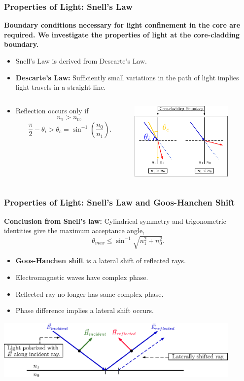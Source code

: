 \documentclass{beamer}
\begin{document}
\begin{frame}
\frametitle{\textbf{Properties of Light:} Snell's Law}
\textbf{Boundary conditions necessary for light confinement in the core are required. We investigate the properties of light at the core-cladding boundary.}
\begin{itemize}
\item Snell's Law is derived from Descarte's Law.
\item \textbf{Descarte's Law:} Sufficiently small variations in the path of light implies light travels in a straight line.
\end{itemize}
\begin{minipage}[1.0\textheight]{\textwidth}
\begin{columns}[T]
\begin{column}{0.45\textwidth}
\vspace{5mm}\begin{itemize}
\item Reflection occurs only if $$n_1>n_0,$$ $$\frac{\pi}{2}-\theta_i>\theta_c=\sin^{-1}{\left(\frac{n_0}{n_1}\right)}.$$
\end{itemize}
\end{column}
\begin{column}{0.5\textwidth}
\includegraphics[width=5cm]{snellsLaw.eps}
\end{column}
\end{columns}
\end{minipage}
\end{frame}

\begin{frame}
\frametitle{\textbf{Properties of Light:} Snell's Law and Goos-Hanchen Shift}
\textbf{Conclusion from Snell's law: }Cylindrical symmetry and trigonometric identities give the maximum acceptance angle,
$$\theta_{max}\leq \sin^{-1}{\sqrt{n_1^2+n_0^2}}.$$
\begin{itemize}
\item \textbf{Goos-Hanchen shift} is a lateral shift of reflected rays.
\item Electromagnetic waves have complex phase.
\item Reflected ray no longer has same complex phase.
\item Phase difference implies a lateral shift occurs.
\end{itemize}
\includegraphics[width=12cm, height=3cm]{lightRayPropagation.eps}
\end{frame}
\end{document}
